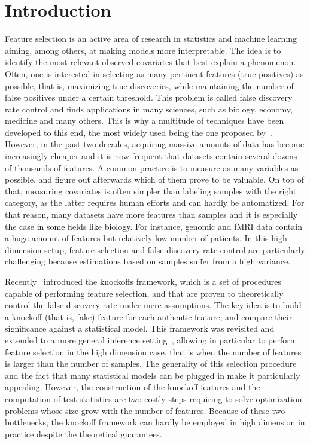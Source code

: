\cleardoublepage
\chapter*{Introduction}

Feature selection is an active area of research in statistics and machine learning
aiming, among others, at making models more interpretable.
The idea is to identify the most relevant observed covariates that best explain a phenomenon.
Often, one is interested in selecting as many pertinent features (true positives) as possible,
that is, maximizing true discoveries,
while maintaining the number of false positives under a certain threshold.
This problem is called false discovery rate control and finds applications in many sciences,
such as biology, economy, medicine and many others.
This is why a multitude of techniques have been developed to this end,
the most widely used being the one proposed by~\cite{bh}.
However, in the past two decades, acquiring massive amounts of data has become increasingly cheaper
and it is now frequent that datasets contain several dozens of thousands of features.
A common practice is to measure as many variables as possible,
and figure out afterwards which of them prove to be valuable.
On top of that, measuring covariates is often simpler than labeling samples with the right category,
as the latter requires human efforts and can hardly be automatized.
For that reason, many datasets have more features than samples
and it is especially the case in some fields like biology.
For instance, genomic and fMRI data contain a huge amount of features but relatively low number of patients.
In this high dimension setup, feature selection and false discovery rate control are particularly challenging
because estimations based on samples suffer from a high variance.

Recently~\citet{fixed_x_knockoffs} introduced the knockoffs framework,
which is a set of procedures capable of performing feature selection,
and that are proven to theoretically control the false discovery rate under mere assumptions.
The key idea is to build a knockoff (that is, fake) feature for each authentic feature,
and compare their significance against a statistical model.
This framework was revisited and extended to a more general inference setting~\citep{model_x_knockoffs},
allowing in particular to perform feature selection in the high dimension case,
that is when the number of features is larger than the number of samples.
The generality of this selection procedure
and the fact that many statistical models can be plugged in make it particularly appealing.
However, the construction of the knockoff features and the computation of test statistics
are two costly steps requiring to solve optimization problems whose size grow with the number of features.
Because of these two bottlenecks,
the knockoff framework can hardly be employed in high dimension in practice despite the theoretical guarantees.

